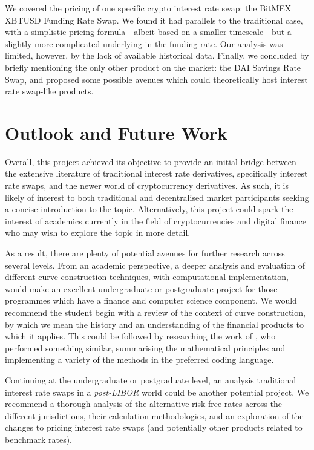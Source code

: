 We covered the pricing of one specific crypto interest rate swap: the BitMEX XBTUSD Funding Rate Swap. We found it had parallels to the traditional case, with a simplistic pricing formula––albeit based on a smaller timescale––but a slightly more complicated underlying in the funding rate. Our analysis was limited, however, by the lack of available historical data. Finally, we concluded by briefly mentioning the only other product on the market: the DAI Savings Rate Swap, and proposed some possible avenues which could theoretically host interest rate swap-like products. 

\section{Outlook and Future Work}

Overall, this project achieved its objective to provide an initial bridge between the extensive literature of traditional interest rate derivatives, specifically interest rate swaps, and the newer world of cryptocurrency derivatives. As such, it is likely of interest to both traditional and decentralised market participants seeking a concise introduction to the topic. Alternatively, this project could spark the interest of academics currently in the field of cryptocurrencies and digital finance who may wish to explore the topic in more detail.

As a result, there are plenty of potential avenues for further research across several levels. From an academic perspective, a deeper analysis and evaluation of different curve construction techniques, with computational implementation, would make an excellent undergraduate or postgraduate project for those programmes which have a finance and computer science component. We would recommend the student begin with a review of the context of curve construction, by which we mean the history and an understanding of the financial products to which it applies. This could be followed by researching the work of \cite{hagan2006interpolation}, who performed something similar, summarising the mathematical principles and implementing a variety of the methods in the preferred coding language.

Continuing at the undergraduate or postgraduate level, an analysis traditional interest rate swaps in a \textit{post-LIBOR} world could be another potential project. We recommend a thorough analysis of the alternative risk free rates across the different jurisdictions, their calculation methodologies, and an exploration of the changes to pricing interest rate swaps (and potentially other products related to benchmark rates).

